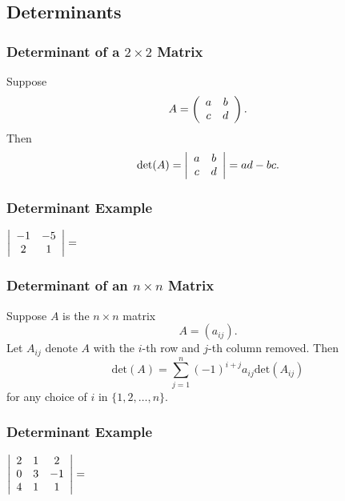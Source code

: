 \documentclass{beamer}
\begin{document}
\subsection{Determinants}

\begin{frame}
\frametitle{Determinant of a $ 2\times 2$ Matrix}
Suppose 
$$
A = \left(\begin{array}{c c} a	&	b\\ c	& d\end{array}\right).
$$
Then
$$
\text{det}(A) = \left| \begin{array}{c c} a	&	b\\ c	& d\end{array}\right| = ad - bc.
$$
\end{frame}

\begin{frame}[t]
\frametitle{Determinant Example}
\begin{Example}
$\left|\begin{array}{c c} -1	&	-5\\	2	&	1\end{array}\right|=$
\end{Example}

\end{frame}

\begin{frame}
\frametitle{Determinant of an $n\times n$ Matrix}
Suppose $A$ is the $n\times n$ matrix
$$
A = \left(a_{ij} \right).
$$
Let $A_{ij}$ denote $A$ with the $i$-th row and $j$-th column removed. Then
$$
\text{det}(A) = \sum_{j = 1}^n (-1)^{i + j} a_{ij}\text{det}(A_{ij})
$$
for any choice of $i$ in $\{1, 2,\ldots, n\}$.

\end{frame}

\begin{frame}[t]
\frametitle{Determinant Example}
\begin{Example}
$
\left|\begin{array}{c c c} 2	&	1	&	2\\	0	&	3	&	-1\\	4	&	1	&	1\end{array}\right| = 
$
\end{Example}

\end{frame}
\end{document}
